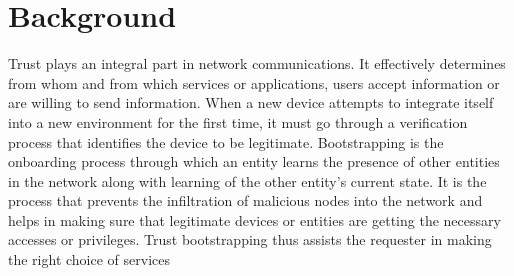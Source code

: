 \section{Background}


Trust plays an integral part in network communications.
It effectively determines from whom and from which services or applications, users accept information or are willing to send information.
When a new device attempts to integrate itself into a new environment for the first time, it must go through a verification process that identifies the device to be legitimate.
Bootstrapping is the onboarding process through which an entity learns the presence of other entities in the network along with learning of the other entity’s current state.
It is the process that prevents the infiltration of malicious nodes into the network and helps in making sure that legitimate devices or entities are getting the necessary accesses or privileges.
Trust bootstrapping thus assists the requester in making the right choice of services 

